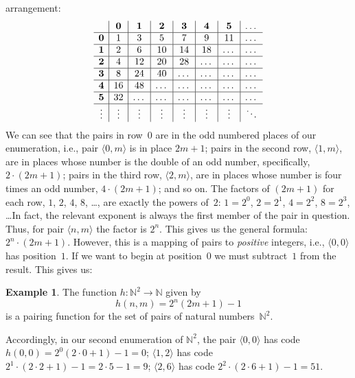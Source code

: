 \documentclass[10pt,a4paper]{article}
\theoremstyle{plain}
\theoremstyle{definition}
\newtheorem{ex}[thm]{Example}
\theoremstyle{remark}
\newenvironment{explain}{}{}
\providecommand{\tuple}[1]{\langle #1 \rangle}
\providecommand{\Nat}{\ensuremath{\mathbb{N}}}
\begin{document}
\begin{explain}
arrangement:
\[
\begin{array}{ c | c | c | c | c | c | c | c }
& \mathbf 0 & \mathbf 1 & \mathbf 2 & \mathbf 3 & \mathbf 4 & \mathbf 5 & \dots \\
\hline
\mathbf 0 & 1 & 3 & 5 & 7 & 9 & 11 & \dots \\
\hline
\mathbf 1 & 2 & 6 & 10 & 14 & 18 & \dots & \dots \\
\hline
\mathbf 2 & 4 & 12 & 20 & 28 & \dots & \dots & \dots \\
\hline
\mathbf 3 & 8 & 24 & 40 & \dots & \dots & \dots & \dots \\
\hline
\mathbf 4 & 16 & 48 & \dots & \dots & \dots & \dots & \dots \\
\hline
\mathbf 5 & 32 & \dots & \dots & \dots & \dots & \dots & \dots \\
\hline
\vdots & \vdots & \vdots & \vdots & \vdots & \vdots & \vdots & \ddots\\
\end{array}
\]
We can see that the pairs in row~$0$ are in the odd numbered places of
our enumeration, i.e., pair $\tuple{0,m}$ is in place $2m+1$; pairs in
the second row, $\tuple{1,m}$, are in places whose number is the
double of an odd number, specifically,  $2 \cdot (2m+1)$; pairs in the
third row, $\tuple{2,m}$, are in places whose number is four times an
odd number, $4 \cdot (2m+1)$; and so on. The factors of $(2m+1)$ for
each row, $1$, $2$, $4$, $8$, \dots, are exactly the powers of~$2$:
$1= 2^0$, $2 = 2^1$, $4 = 2^2$, $8 = 2^3$, \dots\@ In fact, the
relevant exponent is always the first member of the pair in
question. Thus, for pair $\tuple{n,m}$ the factor is $2^n$.  This
gives us the general formula: $2^n \cdot (2m+1)$. However, this is a
mapping of pairs to \emph{positive} integers, i.e., $\tuple{0,0}$ has
position~$1$. If we want to begin at position~$0$ we must subtract~$1$
from the result. This gives us:
\end{explain}

\begin{ex}
The function $h\colon \Nat^2 \to \Nat$ given by
\[
h(n,m) = 2^n (2m+1) - 1
\]
is a pairing function for the set of pairs of natural numbers~$\Nat^2$.
\end{ex}

\begin{explain}
Accordingly, in our second enumeration of $\Nat^2$, the pair
$\tuple{0,0}$ has code $h(0,0) = 2^0(2\cdot 0+1) - 1 = 0$;
$\tuple{1,2}$ has code $2^{1} \cdot (2 \cdot 2 + 1) - 1 = 2
\cdot 5 - 1 = 9$; $\tuple{2,6}$ has code $2^{2} \cdot (2
\cdot 6 + 1) - 1 = 51$.
\end{explain}
\end{document}
